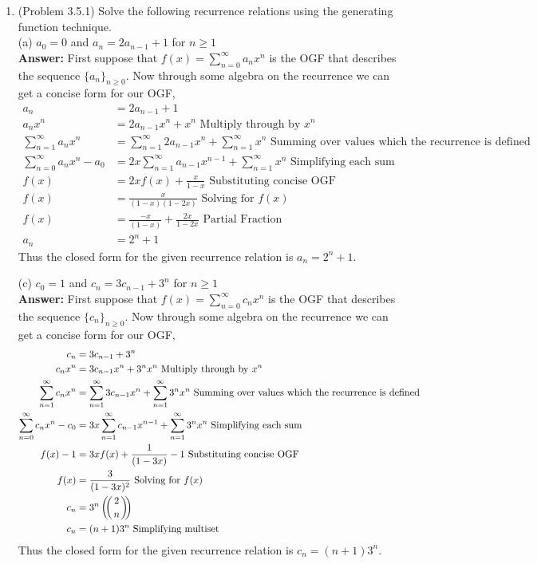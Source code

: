\documentclass{amsart}
\def\multiset#1#2{\ensuremath{\left(\kern-.3em\left(\genfrac{}{}{0pt}{}{#1}{#2}\right)\kern-.3em\right)}}
\newcommand{\textmultiset}[2]{\bigl(\!{\binom{#1}{#2}}\!\bigr)}
\newcommand{\displaymultiset}[2]{\left(\!{\binom{#1}{#2}}\!\right)}
\newcommand\multiset[2]{\mathchoice{\displaymultiset{#1}{#2}}
                                {\textmultiset{#1}{#2}}
                                {\textmultiset{#1}{#2}}
                                {\textmultiset{#1}{#2}}}
\begin{document}
\begin{enumerate}
\item (Problem 3.5.1) Solve the following recurrence relations using the generating function technique.\\

	 (a) $a_0=0$ and $a_n=2a_{n-1}+1$ for $n\geq 1$\\
	 
	 \textbf{Answer:} First suppose that $f(x) = \sum_{n = 0}^{\infty} a_n x^n$ is the OGF that describes the sequence $\{a_n\}_{n\geq0}$. Now through some algebra on the recurrence we can get a concise form for our OGF,
	 \begin{align*}
	 a_n&=2a_{n-1}+1\\
	 a_nx^n&=2a_{n-1}x^n+x^n \text{   Multiply through by $x^n$}\\
	 \sum_{n = 1}^{\infty} a_nx^n&=\sum_{n = 1}^{\infty}2a_{n-1}x^n+\sum_{n = 1}^{\infty}x^n \text{ Summing over values which the recurrence is defined}\\
	 \sum_{n = 0}^{\infty} a_nx^n - a_0 &=2x\sum_{n = 1}^{\infty}a_{n-1}x^{n-1}+\sum_{n = 1}^{\infty}x^n \text {  Simplifying each sum}\\
	 f(x) &= 2xf(x)+\frac{x}{1-x} \text{   Substituting concise OGF}\\
	  f(x) &=\frac{x}{(1-x)(1-2x)}\text{   Solving for $f(x)$}\\
	  f(x) &= \frac{-x}{(1-x)}+\frac{2x}{1-2x} \text{  Partial Fraction}\\
	  a_n &= 2^n+1
	 \end{align*}
	 Thus the closed form for the given recurrence relation is $a_n = 2^n+1$.
	\vspace{.5 in}
	 
	 (c) $c_0=1$ and $c_n=3c_{n-1}+3^n$ for $n\geq 1$\\
	 
	 \textbf{Answer:} First suppose that $f(x) = \sum_{n = 0}^{\infty} c_n x^n$ is the OGF that describes the sequence $\{c_n\}_{n\geq0}$. Now through some algebra on the recurrence we can get a concise form for our OGF,
	  \begin{align*}
	 c_n&=3c_{n-1}+3^n\\
	 c_nx^n&=3c_{n-1}x^n+3^nx^n \text{   Multiply through by $x^n$}\\
	 \sum_{n = 1}^{\infty} c_nx^n&= \sum_{n = 1}^{\infty}3c_{n-1}x^n+ \sum_{n = 1}^{\infty}3^nx^n \text{ Summing over values which the recurrence is defined}\\
	\sum_{n = 0}^{\infty} c_nx^n - c_0 &= 3x\sum_{n = 1}^{\infty}c_{n-1}x^{n-1}+ \sum_{n = 1}^{\infty}3^n x^n \text {  Simplifying each sum} \\
	f(x) -1 &= 3xf(x)+ \frac{1}{(1-3x)} - 1\text{   Substituting concise OGF} \\
	f(x) &= \frac{3}{(1-3x)^2} \text{   Solving for $f(x)$}\\
	c_n &= 3^n \multiset{2}{n}\\
	c_n &= (n+1)3^n \text{ Simplifying multiset}
	 \end{align*}
		 Thus the closed form for the given recurrence relation is $c_n = (n+1)3^n$.
	\vspace{.5 in}
	 

\end{enumerate}
\end{document}
